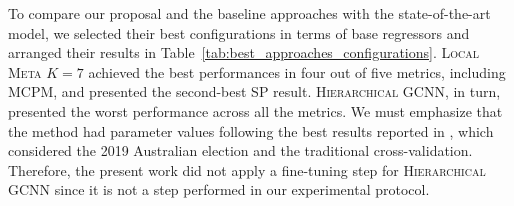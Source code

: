 \documentclass[runningheads]{llncs}
\begin{document}
To compare our proposal and the baseline approaches with the state-of-the-art model, we selected their best configurations in terms of base regressors and arranged their results in Table~\ref{tab:best_approaches_configurations}. \textsc{Local Meta $K=7$} achieved the best performances in four out of five metrics, including MCPM, and presented the second-best SP result. \textsc{Hierarchical GCNN}, in turn, presented the worst performance across all the metrics. We must emphasize that the method had parameter values following the best results reported in \cite{li2019deep}, which considered the 2019 Australian election and the traditional cross-validation. Therefore, the present work did not apply a fine-tuning step for \textsc{Hierarchical GCNN} since it is not a step performed in our experimental protocol.


\end{document}
